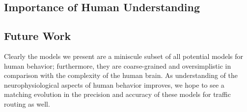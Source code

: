 \documentclass[acmlarge]{acmart}
\begin{document}
\subsection{Importance of Human Understanding}
\subsection{Future Work}
Clearly the models we present are a miniscule subset of all potential models for human behavior; 
furthermore, they are coarse-grained and oversimplistic in comparison with the complexity of the human
brain. As understanding of the neurophysiological aspects of human behavior improves, we hope to see a matching evolution in the precision and accuracy of these models for traffic routing as well.



\end{document}
